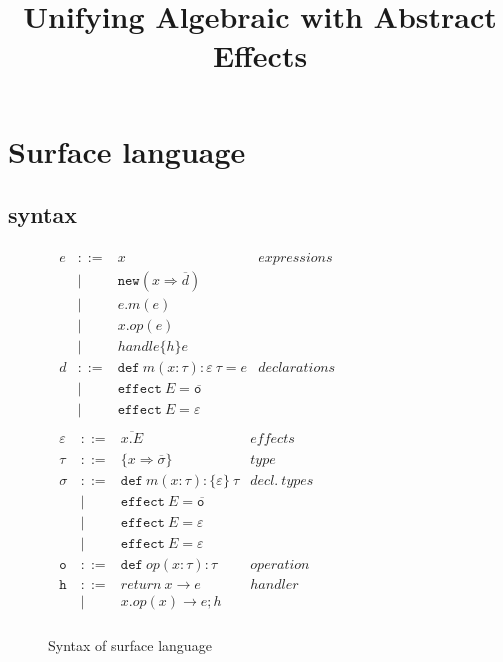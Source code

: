 \documentclass{article}
\theoremstyle{definition}
\newcommand{\keywadj}[1]{\mathtt{#1}}
\newcommand{\keyw}[1]{\keywadj{#1}~}
\begin{document}
\title{Unifying Algebraic with Abstract Effects}
\maketitle


\section{Surface language}
\subsection{syntax}
\begin{figure}[H]
\small{
\[
\begin{array}{lll}
\begin{array}{lllr}
e & ::= & x & \mathit{expressions}\\
& | & \keywadj{new}(x \Rightarrow \overline{d}) \\
& | & e.m(e)\\
& | & x.op(e)\\
& | & handle \{ h \} e\\
d & ::= & \keyw{def} m(x : \tau) :  \varepsilon ~\tau = e &
\mathit{declarations}\\
& |   & \keyw{effect} E = \overline{\keyw{o}} \\
& |   & \keyw{effect} E = \varepsilon \\

\end{array}
\begin{array}{lllr}
\varepsilon & ::= & \overline{x.E} & \mathit{effects}\\
\tau & ::= & \{ x \Rightarrow \overline{\sigma} \} & \mathit{type}\\
\sigma & ::= & \keyw{def} m(x : \tau) : \{\varepsilon\} ~\tau & \mathit{decl.~types}\\
       & |   & \keyw{effect} E = \overline{\keyw{o}}\\
       & |   & \keyw{effect} E = \varepsilon \\
       & |   & \keyw{effect} E = \varepsilon \\
\keyw{o} & ::= & \keyw{def} op(x:\tau):  \tau & \mathit{operation}\\
\keyw{h} & ::= & return\ x \rightarrow e & \mathit{handler}\\
& | & x.op(x) \rightarrow e; h\\
\
\end{array}
\end{array}
\]
}
\caption{Syntax of surface language}
\end{figure}
\end{document}
